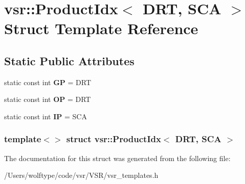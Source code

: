 \hypertarget{structvsr_1_1_product_idx_3_01_d_r_t_00_01_s_c_a_01_4}{\section{vsr\-:\-:Product\-Idx$<$ D\-R\-T, S\-C\-A $>$ Struct Template Reference}
\label{structvsr_1_1_product_idx_3_01_d_r_t_00_01_s_c_a_01_4}
}
\subsection*{Static Public Attributes}
\begin{DoxyCompactItemize}
\item 
\hypertarget{structvsr_1_1_product_idx_3_01_d_r_t_00_01_s_c_a_01_4_ace16391b0093949a754d7f21ec1b5ef6}{static const int {\bfseries G\-P} = D\-R\-T}\label{structvsr_1_1_product_idx_3_01_d_r_t_00_01_s_c_a_01_4_ace16391b0093949a754d7f21ec1b5ef6}

\item 
\hypertarget{structvsr_1_1_product_idx_3_01_d_r_t_00_01_s_c_a_01_4_aed64773e81cda3639978214f95bedd7f}{static const int {\bfseries O\-P} = D\-R\-T}\label{structvsr_1_1_product_idx_3_01_d_r_t_00_01_s_c_a_01_4_aed64773e81cda3639978214f95bedd7f}

\item 
\hypertarget{structvsr_1_1_product_idx_3_01_d_r_t_00_01_s_c_a_01_4_a344e7c7ff6341d6e85d98fadab283de7}{static const int {\bfseries I\-P} = S\-C\-A}\label{structvsr_1_1_product_idx_3_01_d_r_t_00_01_s_c_a_01_4_a344e7c7ff6341d6e85d98fadab283de7}

\end{DoxyCompactItemize}
\subsubsection*{template$<$$>$ struct vsr\-::\-Product\-Idx$<$ D\-R\-T, S\-C\-A $>$}



The documentation for this struct was generated from the following file\-:\begin{DoxyCompactItemize}
\item 
/\-Users/wolftype/code/vsr/\-V\-S\-R/vsr\-\_\-templates.\-h\end{DoxyCompactItemize}
